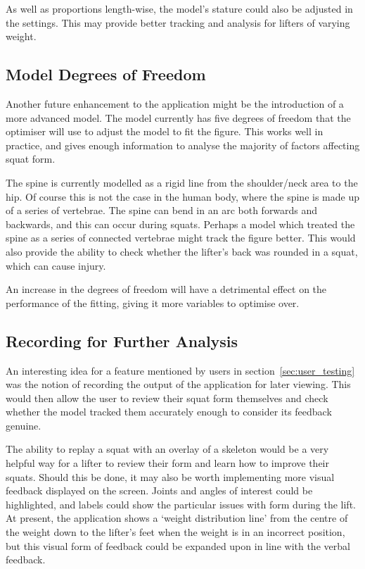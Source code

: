 As well as proportions length-wise, the model's stature could also be adjusted in the settings. This may provide better tracking and analysis for lifters of varying weight.

\subsection{Model Degrees of Freedom}

Another future enhancement to the application might be the introduction of a more advanced model. The model currently has five degrees of freedom that the optimiser will use to adjust the model to fit the figure. This works well in practice, and gives enough information to analyse the majority of factors affecting squat form.

The spine is currently modelled as a rigid line from the shoulder/neck area to the hip. Of course this is not the case in the human body, where the spine is made up of a series of vertebrae. The spine can bend in an arc both forwards and backwards, and this can occur during squats. Perhaps a model which treated the spine as a series of connected vertebrae might track the figure better. This would also provide the ability to check whether the lifter's back was rounded in a squat, which can cause injury.

An increase in the degrees of freedom will have a detrimental effect on the performance of the fitting, giving it more variables to optimise over.

\subsection{Recording for Further Analysis}

An interesting idea for a feature mentioned by users in section~\ref{sec:user_testing} was the notion of recording the output of the application for later viewing. This would then allow the user to review their squat form themselves and check whether the model tracked them accurately enough to consider its feedback genuine.

The ability to replay a squat with an overlay of a skeleton would be a very helpful way for a lifter to review their form and learn how to improve their squats. Should this be done, it may also be worth implementing more visual feedback displayed on the screen. Joints and angles of interest could be highlighted, and labels could show the particular issues with form during the lift. At present, the application shows a `weight distribution line' from the centre of the weight down to the lifter's feet when the weight is in an incorrect position, but this visual form of feedback could be expanded upon in line with the verbal feedback.

